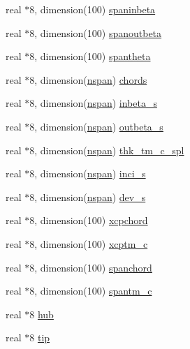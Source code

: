 \begin{DoxyCompactItemize}
real $\ast$8, dimension(100) \hyperlink{namespaceglobvar_a9b67a74e3faac41a7e1cc636aa467efb}{spaninbeta}
\item 
real $\ast$8, dimension(100) \hyperlink{namespaceglobvar_a7ce1073506dd3e70987eab670a28928d}{spanoutbeta}
\item 
real $\ast$8, dimension(100) \hyperlink{namespaceglobvar_a9a59ebb9cb5ab3b30e153f7b8c129c09}{spantheta}
\item 
real $\ast$8, dimension(\hyperlink{namespaceglobvar_adeb7d084c25deee7802eab03d40830c5}{nspan}) \hyperlink{namespaceglobvar_a103f2629767cb895acfd77c69b4fdcd2}{chords}
\item 
real $\ast$8, dimension(\hyperlink{namespaceglobvar_adeb7d084c25deee7802eab03d40830c5}{nspan}) \hyperlink{namespaceglobvar_ac564ea1048d771da8ef902ab237e6cd4}{inbeta\+\_\+s}
\item 
real $\ast$8, dimension(\hyperlink{namespaceglobvar_adeb7d084c25deee7802eab03d40830c5}{nspan}) \hyperlink{namespaceglobvar_a7c178a712e3c274e2a3496efbea3f9e7}{outbeta\+\_\+s}
\item 
real $\ast$8, dimension(\hyperlink{namespaceglobvar_adeb7d084c25deee7802eab03d40830c5}{nspan}) \hyperlink{namespaceglobvar_ae980d61bc1b36665a6e34c2550f78542}{thk\+\_\+tm\+\_\+c\+\_\+spl}
\item 
real $\ast$8, dimension(\hyperlink{namespaceglobvar_adeb7d084c25deee7802eab03d40830c5}{nspan}) \hyperlink{namespaceglobvar_abe8aad5ab0f38bb4ec7e960415ced26a}{inci\+\_\+s}
\item 
real $\ast$8, dimension(\hyperlink{namespaceglobvar_adeb7d084c25deee7802eab03d40830c5}{nspan}) \hyperlink{namespaceglobvar_a03bd2d274fd38f87435439d86e0f92c2}{dev\+\_\+s}
\item 
real $\ast$8, dimension(100) \hyperlink{namespaceglobvar_a7d3222448b640704a89fa6cdc07a4331}{xcpchord}
\item 
real $\ast$8, dimension(100) \hyperlink{namespaceglobvar_a8553c7b87c906988c811df4d4b810bbf}{xcptm\+\_\+c}
\item 
real $\ast$8, dimension(100) \hyperlink{namespaceglobvar_ad2c20e4194dda60c8e4a46ad62a24099}{spanchord}
\item 
real $\ast$8, dimension(100) \hyperlink{namespaceglobvar_ad0a1491128c64a390fc1925c63c43a9a}{spantm\+\_\+c}
\item 
real $\ast$8 \hyperlink{namespaceglobvar_afe5a2fb0a1ae94505f2ade324addffd6}{hub}
\item 
real $\ast$8 \hyperlink{namespaceglobvar_ae899a4ed69eab45967a2e360c288f62f}{tip}
\item 

\end{DoxyCompactItemize}
